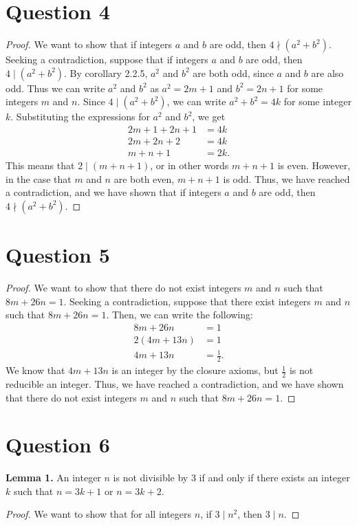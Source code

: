 \documentclass{article}
\begin{document}
\section*{Question 4}
\begin{proof}
    We want to show that if integers $a$ and $b$ are odd, then $4 \nmid (a^2 + b^2)$.
    Seeking a contradiction, suppose that if integers $a$ and $b$ are odd, then $4 \mid (a^2 + b^2)$.
    By corollary 2.2.5, $a^2$ and $b^2$ are both odd, since $a$ and $b$ are also odd.
    Thus we can write $a^2$ and $b^2$ as $a^2 = 2m + 1$ and $b^2 = 2n + 1$ for some integers $m$ and $n$.
    Since $4 \mid (a^2 + b^2)$, we can write $a^2 + b^2 = 4k$ for some integer $k$.
    Substituting the expressions for $a^2$ and $b^2$, we get
    \begin{align*}
        2m + 1 + 2n + 1 &= 4k \\
        2m + 2n + 2 &= 4k \\
        m + n + 1 &= 2k.
    \end{align*}
    This means that $2 \mid (m + n + 1)$, or in other words $m + n + 1$ is even.
    However, in the case that $m$ and $n$ are both even, $m + n + 1$ is odd.
    Thus, we have reached a contradiction, and we have shown that if integers $a$ and $b$ are odd, then $4 \nmid (a^2 + b^2)$.
\end{proof}

\section*{Question 5}
\begin{proof}
    We want to show that there do not exist integers $m$ and $n$ such that $8m + 26n = 1$.
    Seeking a contradiction, suppose that there exist integers $m$ and $n$ such that $8m + 26n = 1$.
    Then, we can write the following:
    \begin{align*}
        8m + 26n &= 1 \\
        2(4m + 13n) &= 1 \\
        4m + 13n &= \frac{1}{2}.
    \end{align*}
    We know that $4m + 13n$ is an integer by the closure axioms, but $\frac{1}{2}$ is not reducible an integer.
    Thus, we have reached a contradiction, and we have shown that there do not exist integers $m$ and $n$ such that $8m + 26n = 1$.
\end{proof}

\section*{Question 6}
\textbf{Lemma 1.} An integer $n$ is not divisible by 3 if and only if there exists an integer $k$ such that $n = 3k + 1$ or $n = 3k + 2$.
\begin{proof}
    We want to show that for all integers $n$, if $3 \mid n^2$, then $3 \mid n$.
\end{proof}
\end{document}
